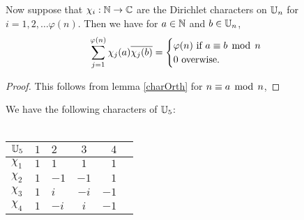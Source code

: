 \documentclass{unswmaths}
\begin{document}
    \begin{lemma}
        Now suppose that $\chi_i:\mathbb{N} \rightarrow \mathbb{C}$ are the Dirichlet characters on $\mathbb{U}_n$ for $i = 1,2,\ldots \varphi(n)$. Then we have for $a \in \mathbb{N}$ and $b\in \mathbb{U}_n$,
        \begin{equation*}
            \sum_{j=1}^{\varphi(n)} \chi_j(a)\overline{\chi_j(b)} = \begin{cases}
                \varphi(n)\text{ if }a \equiv b\;\operatorname{mod}\;n\\
                0\text{ overwise.}
            \end{cases}
        \end{equation*}
    \end{lemma}
    \begin{proof}
        This follows from lemma \ref{charOrth} for $n \equiv a \;\operatorname{mod}\;n$, 
    \end{proof}
    
    
    \begin{definition}
        We have the following characters of $\mathbb{U}_5$:
        \\
        \\        
        \begin{tabular}{| l | cl  cr | r |}
        \hline
        $\mathbb{U}_5$ & $1$ & $2$ & $3$ & $4$\\
        \hline
        $\chi_1$  & $1$ & $1$ & $1$ & $1$\\
        $\chi_2$  & $1$ & $-1$ & $-1$ & $1$\\
        $\chi_3$  & $1$ & $i$ & $-i$ & $-1$\\
        $\chi_4$  & $1$ & $-i$ & $i$ & $-1$\\
        \hline
        \end{tabular}
    \end{definition}
    
\end{document}
